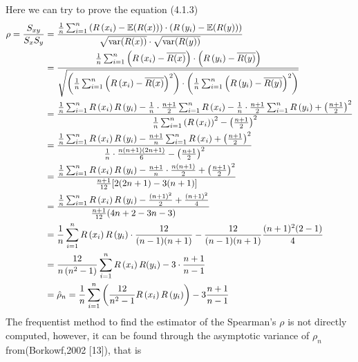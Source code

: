 \documentclass[mstat,12pt]{unswthesis}  %
\newcommand{\var}{\mathop{\rm var}}
\numberwithin{equation}{section}
\begin{document}
Here we can try to prove the equation (4.1.3)
\begin{equation}
\begin{split}
\rho=\frac{S_{x y}}{S_{x} S_{y}} &=\frac{\frac{1}{n} \sum_{i=1}^{n}\left(R\left(x_{i}\right)-\mathbb{E}(R(x))\right) \cdot\left(R\left(y_{i}\right)-\mathbb{E}(R(y))\right)}{\sqrt{\var(R(x))} \cdot\sqrt{\var(R(y))}}\\
& = \frac{\frac{1}{n} \sum_{i=1}^{n}\left(R\left(x_{i}\right)-\overline{R(x)}\right) \cdot\left(R\left(y_{i}\right)-\overline{R(y)}\right)}{\sqrt{\left(\frac{1}{n} \sum_{i=1}^{n}\left(R\left(x_{i}\right)-\overline{R(x)}\right)^{2}\right) \cdot\left(\frac{1}{n} \sum_{i=1}^{n}\left(R\left(y_{i}\right)-\overline{R(y)}\right)^{2}\right)}}\\
& = \frac{\frac{1}{n} \sum_{i=1}^{n} R\left(x_{i}\right) R\left(y_{i}\right)-\frac{1}{n} \cdot \frac{n+1}{2} \sum_{i=1}^{n} R\left(x_{i}\right)-\frac{1}{n} \cdot \frac{n+1}{2} \sum_{i=1}^{n} R\left(y_{i}\right)+\left(\frac{n+1}{2}\right)^{2}}{\frac{1}{n} \sum_{i=1}^{n}\left(R\left(x_{i}\right)\right)^{2}-\left(\frac{n+1}{2}\right)^{2}}\\
& = \frac{\frac{1}{n} \sum_{i=1}^{n} R\left(x_{i}\right) R\left(y_{i}\right)-\frac{n+1}{n} \sum_{i=1}^{n} R\left(x_{i}\right)+\left(\frac{n+1}{2}\right)^{2}}{\frac{1}{n} \cdot \frac{n(n+1)(2 n+1)}{6}-\left(\frac{n+1}{2}\right)^{2}}\\
& = \frac{\frac{1}{n} \sum_{i=1}^{n} R\left(x_{i}\right) R\left(y_{i}\right)-\frac{n+1}{n} \cdot \frac{n(n+1)}{2}+\left(\frac{n+1}{2}\right)^{2}}{\frac{n+1}{12}[2(2 n+1)-3(n+1)]}\\
& = \frac{\frac{1}{n} \sum_{i=1}^{n} R\left(x_{i}\right) R\left(y_{i}\right)-\frac{(n+1)^{2}}{2}+\frac{(n+1)^{2}}{4}}{\frac{n+1}{12}(4 n+2-3 n-3)}\\
& = \frac{1}{n} \sum_{i=1}^{n} R\left(x_{i}\right) R\left(y_{i}\right) \cdot \frac{12}{(n-1)(n+1)}-\frac{12}{(n-1)(n+1)} \frac{(n+1)^{2}(2-1)}{4}\\
& = \frac{12}{n\left(n^{2}-1\right)} \sum_{i=1}^{n} R\left(x_{i}\right) R(y_i)- 3 \cdot \frac{n+1}{n-1}\\
& = \hat{\rho}_{n}=\frac{1}{n} \sum_{i=1}^{n}\left(\frac{12}{n^{2}-1} R\left(x_{i}\right) R\left(y_{i}\right)\right)-3 \frac{n+1}{n-1}
\end{split}
\end{equation}
The frequentist method to find the estimator of the Spearman's $\rho$ is not directly computed, however, it can be found through the asymptotic variance of $\rho_n$ from(Borkowf,2002 [13]), that is
\end{document}
